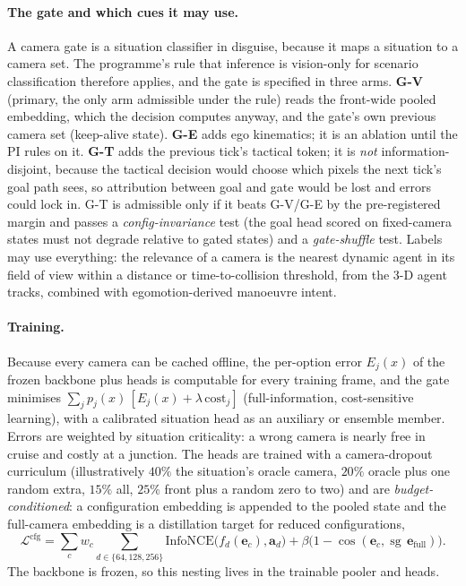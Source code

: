\paragraph{The gate and which cues it may use.}
A camera gate is a situation classifier in disguise, because it maps a situation to a camera set. The programme's rule that inference is vision-only for scenario classification therefore applies, and the gate is specified in three arms.
\textbf{G-V} (primary, the only arm admissible under the rule) reads the front-wide pooled embedding, which the decision computes anyway, and the gate's own previous camera set (keep-alive state). \textbf{G-E} adds ego kinematics; it is an ablation until the PI rules on it.
\textbf{G-T} adds the previous tick's tactical token; it is \emph{not} information-disjoint, because the tactical decision would choose which pixels the next tick's goal path sees, so attribution between goal and gate would be lost and errors could lock in. G-T is admissible only if it beats G-V/G-E by the pre-registered margin and passes a \emph{config-invariance} test (the goal head scored on fixed-camera states must not degrade relative to gated states) and a \emph{gate-shuffle} test.
Labels may use everything: the relevance of a camera is the nearest dynamic agent in its field of view within a distance or time-to-collision threshold, from the 3-D agent tracks, combined with egomotion-derived manoeuvre intent.

\paragraph{Training.}
Because every camera can be cached offline, the per-option error $E_j(x)$ of the frozen backbone plus heads is computable for every training frame, and the gate minimises $\sum_jp_j(x)\,[E_j(x)+\lambda\,\mathrm{cost}_j]$ (full-information, cost-sensitive learning), with a calibrated situation head as an auxiliary or ensemble member. Errors are weighted by situation criticality: a wrong camera is nearly free in cruise and costly at a junction.
The heads are trained with a camera-dropout curriculum (illustratively $40\%$ the situation's oracle camera, $20\%$ oracle plus one random extra, $15\%$ all, $25\%$ front plus a random zero to two) and are \emph{budget-conditioned}: a configuration embedding is appended to the pooled state and the full-camera embedding is a distillation target for reduced configurations,
\begin{equation}
\mathcal L^{\text{cfg}}=\sum_{c}w_c\sum_{d\in\{64,128,256\}}\mathrm{InfoNCE}\big(f_d(\mathbf e_c),\mathbf a_d\big)+\beta\big(1-\cos(\mathbf e_c,\operatorname{sg}\,\mathbf e_{\text{full}})\big).
\end{equation}
The backbone is frozen, so this nesting lives in the trainable pooler and heads.

